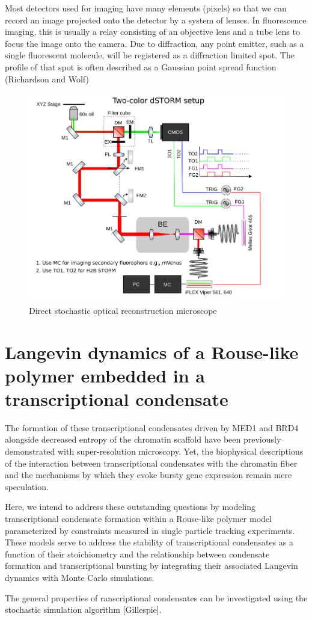 \documentclass{article}
\begin{document}
Most detectors used for imaging have many elements (pixels) so that we can record an image projected onto the detector by a system of lenses. In fluorescence imaging, this is usually a relay consisting of an objective lens and a tube lens to focus the image onto the camera. Due to diffraction, any point emitter, such as a single fluorescent molecule, will be registered as a diffraction limited spot. The profile of that spot is often described as a Gaussian point spread function (Richardson and Wolf)

\begin{figure}
\centering
\includegraphics[width=12cm]{dSTORM.png}
\caption{Direct stochastic optical reconstruction microscope}
\end{figure}

\section{Langevin dynamics of a Rouse-like polymer embedded in a transcriptional condensate}

The formation of these transcriptional condensates driven by MED1 and BRD4 alongside decreased entropy of the chromatin scaffold have been previously demonstrated with super-resolution microscopy. Yet, the biophysical descriptions of the interaction between transcriptional condensates with the chromatin fiber and the mechanisms by which they evoke bursty gene expression remain mere speculation. 

Here, we intend to address these outstanding questions by modeling transcriptional condensate formation within a Rouse-like polymer model parameterized by constraints measured in single particle tracking experiments. These models serve to address the stability of transcriptional condensates as a function of their stoichiometry and the relationship between condensate formation and transcriptional bursting by integrating their associated Langevin dynamics with Monte Carlo simulations. 


The general properties of ranscriptional condensates can be investigated using the stochastic simulation algorithm [Gillespie].

 



 
\end{document}
